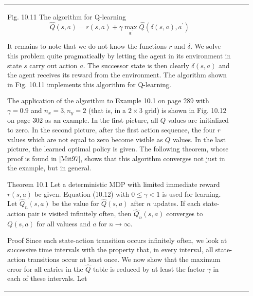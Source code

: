 \documentclass[10pt]{book}
\begin{document}
\begin{center}
\begin{tabular}{|l|l|l|}
Fig. 10.11 The algorithm for Q-learning
\begin{equation*}
\hat{Q}(s, a)=r(s, a)+\gamma \max _{a^{\prime}} \hat{Q}\left(\delta(s, a), a^{\prime}\right) \tag{10.12}
\end{equation*}

It remains to note that we do not know the functions $r$ and $\delta$. We solve this problem quite pragmatically by letting the agent in its environment in state $s$ carry out action $a$. The successor state is then clearly $\delta(s, a)$ and the agent receives its reward from the environment. The algorithm shown in Fig. 10.11 implements this algorithm for Q-learning.

The application of the algorithm to Example 10.1 on page 289 with $\gamma=0.9$ and $n_{x}=3, n_{y}=2$ (that is, in a $2 \times 3$ grid) is shown in Fig. 10.12 on page 302 as an example. In the first picture, all $Q$ values are initialized to zero. In the second picture, after the first action sequence, the four $r$ values which are not equal to zero become visible as $Q$ values. In the last picture, the learned optimal policy is given. The following theorem, whose proof is found in [Mit97], shows that this algorithm converges not just in the example, but in general.

\begin{displayquote}
Theorem 10.1 Let a deterministic MDP with limited immediate reward $r(s, a)$ be given. Equation (10.12) with $0 \leq \gamma<1$ is used for learning. Let $\hat{Q}_{n}(s, a)$ be the value for $\hat{Q}(s, a)$ after $n$ updates. If each state-action pair is visited infinitely often, then $\hat{Q}_{n}(s, a)$ converges to $Q(s, a)$ for all valuess and $a$ for $n \rightarrow \infty$.
\end{displayquote}

Proof Since each state-action transition occurs infinitely often, we look at successive time intervals with the property that, in every interval, all state-action transitions occur at least once. We now show that the maximum error for all entries in the $\hat{Q}$ table is reduced by at least the factor $\gamma$ in each of these intervals. Let


\end{tabular}
\end{center}
\end{document}
